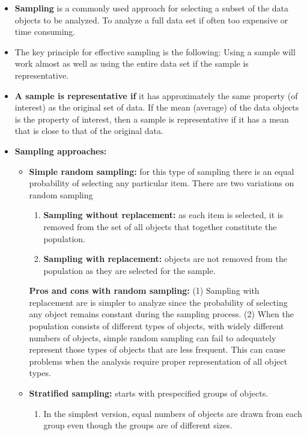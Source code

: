 		\begin{itemize}
			\item {\bf Sampling} is a commonly used approach for selecting a subset of the data 
			objects to be analyzed. To analyze a full data set if often too expensive or 
			time consuming. 
			\item The key principle for effective sampling is the following: Using a sample
			will work almost as well as using the entire data set if the sample is 
			representative.
			\item {\bf A sample is representative if} it has approximately the same property 
			(of interest) as the original set of data. If the mean (average) of the data
			objects is the property of interest, then a sample is representative if it has
			a mean that is close to that of the original data. 
			\item {\bf Sampling approaches:}
				\begin{itemize}
					\item {\bf Simple random sampling: } for this type of sampling there is 
					an equal probability of selecting any particular item. There are two 
					variations on random sampling
						\begin{enumerate}
							\item {\bf Sampling without replacement:} as each item is selected, it is
							removed from the set of all objects that together constitute the
							population. 
							\item {\bf Sampling with replacement:} objects are not removed from 
							the population as they are selected for the sample. 
						\end{enumerate}
					{\bf Pros and cons with random sampling:}  
					(1) Sampling with replacement are is simpler to analyze since the probability 
					of selecting any object remains constant during the sampling process. 
					(2) When the population consists of different types of objects, with widely
					different numbers of objects, simple random sampling can fail to adequately
					represent those types of objects that are less frequent. This can cause
					problems when the analysis require proper representation of all object types.
					\item {\bf Stratified sampling:} starts with prespecified groups of objects.
						\begin{enumerate}
							\item In the simplest version, equal numbers of objects are drawn from 
							each group even though the groups are of different sizes. 

\end{enumerate}
\end{itemize}
\end{itemize}
